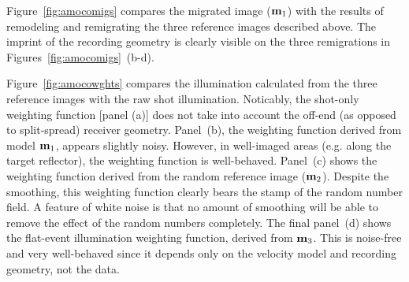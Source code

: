 \par
Figure~\ref{fig:amocomigs} compares the migrated image (${\bf m}_1$)
with the results of remodeling and remigrating the three reference
images described above.  The imprint of the recording geometry is
clearly visible on the three remigrations in
Figures~\ref{fig:amocomigs}~(b-d).

\par
Figure~\ref{fig:amocowghts} compares the illumination calculated from
the three reference images with the raw shot illumination.
Noticably, the shot-only weighting function [panel (a)] does not take
into account the off-end (as opposed to split-spread) receiver geometry. 
Panel~(b), the weighting function derived from
model ${\bf m}_1$, appears slightly noisy.  However, in well-imaged
areas (e.g. along the target reflector), the weighting function is
well-behaved.  
Panel~(c) shows the weighting function derived from the random
reference image (${\bf m}_2$).  Despite the smoothing, this weighting 
function clearly bears the stamp of the random number field. A feature
of white noise is that no amount of smoothing will be able to
remove the effect of the random numbers completely.
The final panel~(d) shows the flat-event illumination weighting
function, derived from ${\bf m}_3$.  This is noise-free and very
well-behaved since it depends only on the velocity model and recording
geometry, not the data. 


